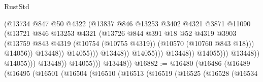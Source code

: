 \begin{lexlean}{RustStd}
\begin{coremodule}
                                                      (@13734
                                                        @847
                                                        @50
                                                        @4322
                                                        (@13837
                                                          @846
                                                          @13253
                                                          @3402
                                                          @4321
                                                          @3871
                                                          @11090
                                                          (@13721
                                                            @846
                                                            @13253
                                                            @4321
                                                            (@13726
                                                              @844
                                                              @391
                                                              @18
                                                              @52
                                                              @4319
                                                              @3903
                                                              (@13759
                                                                @843
                                                                @4319
                                                                (@10754 (@10755 @4319))
                                                                (@10570 (@10760 @843 @18)))
                                                              @14056))
                                                          @13448))
                                                      @14055)))
                                                @13448))
                                            @14055)))
                                      @13448))
                                  @14055)))
                            @13448))
                        @14055)))
                  @13448))
              @14055)))
        @13448))
@16882 := @16480
    (@16486
      (@16489
        (@16495
          (@16501
            (@16504
              (@16510
                (@16513
                  (@16519
                    (@16525
                      (@16528
                        (@16534

\end{coremodule}
\end{lexlean}
